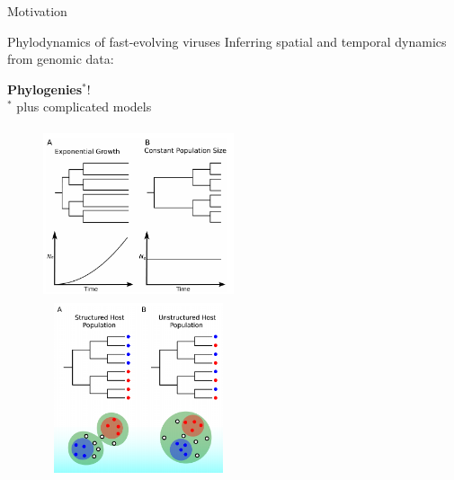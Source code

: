 \documentclass[newPxFont,numfooter,sectionpages]{beamer}
\begin{document}
\begingroup
\begin{frame}{Motivation}
\begin{block}{Phylodynamics of fast-evolving viruses}
 Inferring spatial and temporal dynamics from genomic data:
 \begin{center}
  \Large \textbf{Phylogenies}$^\ast$! \\
  \tiny $^\ast$ plus complicated models
 \end{center}
\end{block}
\begin{figure}
	\centerline{
	\includegraphics[width=0.5\textwidth,height=5cm]{figures/pop_growth.jpg} \\ 
	\includegraphics[width=0.5\textwidth,height=5cm]{figures/pop_structure.jpg}
	}
\end{figure}
\end{frame}
\endgroup
\end{document}
